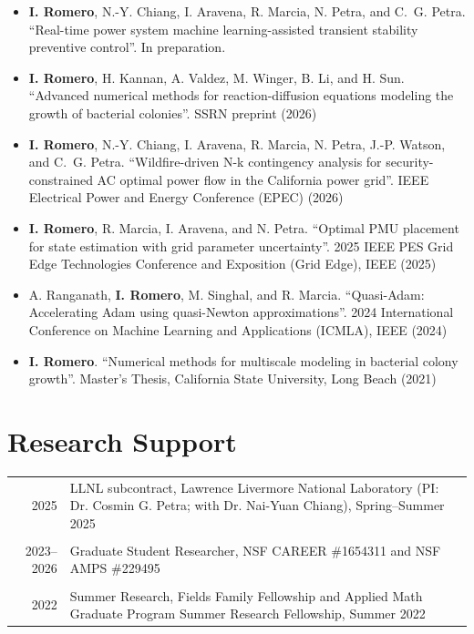 \documentclass[11pt]{article}
\begin{document}
\begin{itemize}
\item {\bf I. Romero}, N.-Y. Chiang, I. Aravena, R. Marcia, N. Petra,
  and C.~G. Petra. ``Real-time power system machine learning-assisted
  transient stability preventive control''. In preparation.
\item {\bf I. Romero}, H. Kannan, A. Valdez, M. Winger, B. Li, and
  H. Sun. ``Advanced numerical methods for reaction-diffusion equations
  modeling the growth of bacterial colonies''. SSRN preprint (2026)
\item {\bf I. Romero}, N.-Y. Chiang, I. Aravena, R. Marcia, N. Petra,
  J.-P. Watson, and C.~G. Petra. ``Wildfire-driven N-k contingency
  analysis for security-constrained AC optimal power flow in the
  California power grid''. IEEE Electrical Power and Energy Conference
  (EPEC) (2026)
\item {\bf I. Romero}, R. Marcia, I. Aravena, and N. Petra. ``Optimal
  PMU placement for state estimation with grid parameter uncertainty''.
  2025 IEEE PES Grid Edge Technologies Conference and Exposition (Grid
  Edge), IEEE (2025)
\item A. Ranganath, {\bf I. Romero}, M. Singhal, and R. Marcia.
  ``Quasi-Adam: Accelerating Adam using quasi-Newton approximations''.
  2024 International Conference on Machine Learning and Applications
  (ICMLA), IEEE (2024)
\item {\bf I. Romero}. ``Numerical methods for multiscale
  modeling in bacterial colony growth''. Master's Thesis, California State University, Long
  Beach (2021)
\end{itemize}

\section*{Research Support}

\vskip 0.1in
\noindent
\begin{tabular}{rp{}}
  2025 & LLNL subcontract, Lawrence Livermore National Laboratory (PI:
  Dr. Cosmin G. Petra; with Dr. Nai-Yuan Chiang), Spring--Summer 2025 \\\\
  2023--2026 & Graduate Student Researcher, NSF CAREER \#1654311 and NSF
  AMPS \#229495 \\\\
  2022 & Summer Research, Fields Family Fellowship and Applied Math
  Graduate Program Summer Research Fellowship, Summer 2022
\end{tabular}
\end{document}

